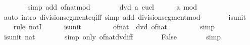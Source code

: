 \begin{isabellebody}
\ \ \ \ \ \ \isamarkupfalse%
\ {\isacharparenleft}{\kern0pt}simp\ add{\isacharcolon}{\kern0pt}\ of{\isacharunderscore}{\kern0pt}nat{\isacharunderscore}{\kern0pt}mod{\isacharparenright}{\kern0pt}\isanewline
\ \ \ \ \isamarkupfalse%
\ {\isacartoucheopen}{\isasymnot}\ {}\ dvd\ a{\isacartoucheclose}\ eucl\isanewline
\ \ \ \ \isamarkupfalse%
\ {\isachardoublequoteopen}a\ mod\ {}\ {\isacharequal}{\kern0pt}\ {}{\isachardoublequoteclose}\isanewline
\ \ \ \ \ \ \isamarkupfalse%
\ {\isacharparenleft}{\kern0pt}auto\ intro{\isacharcolon}{\kern0pt}\ division{\isacharunderscore}{\kern0pt}segment{\isacharunderscore}{\kern0pt}eq{\isacharunderscore}{\kern0pt}iff\ simp\ add{\isacharcolon}{\kern0pt}\ division{\isacharunderscore}{\kern0pt}segment{\isacharunderscore}{\kern0pt}mod{\isacharparenright}{\kern0pt}\isanewline
\ \ \isamarkupfalse%
\isanewline
\ \ \isamarkupfalse%
\ {\isachardoublequoteopen}{\isasymnot}\ is{\isacharunderscore}{\kern0pt}unit\ {}{\isachardoublequoteclose}\isanewline
\ \ \isamarkupfalse%
\ {\isacharparenleft}{\kern0pt}rule\ notI{\isacharparenright}{\kern0pt}\isanewline
\ \ \ \ \isamarkupfalse%
\ {\isachardoublequoteopen}is{\isacharunderscore}{\kern0pt}unit\ {}{\isachardoublequoteclose}\isanewline
\ \ \ \ \isamarkupfalse%
\ \isamarkupfalse%
\ {\isachardoublequoteopen}of{\isacharunderscore}{\kern0pt}nat\ {}\ dvd\ of{\isacharunderscore}{\kern0pt}nat\ {}{\isachardoublequoteclose}\isanewline
\ \ \ \ \ \ \isamarkupfalse%
\ simp\isanewline
\ \ \ \ \isamarkupfalse%
\ \isamarkupfalse%
\ {\isachardoublequoteopen}is{\isacharunderscore}{\kern0pt}unit\ {\isacharparenleft}{\kern0pt}{}{\isacharcolon}{\kern0pt}{\isacharcolon}{\kern0pt}nat{\isacharparenright}{\kern0pt}{\isachardoublequoteclose}\isanewline
\ \ \ \ \ \ \isamarkupfalse%
\ {\isacharparenleft}{\kern0pt}simp\ only{\isacharcolon}{\kern0pt}\ of{\isacharunderscore}{\kern0pt}nat{\isacharunderscore}{\kern0pt}dvd{\isacharunderscore}{\kern0pt}iff{\isacharparenright}{\kern0pt}\isanewline
\ \ \ \ \isamarkupfalse%
\ \isamarkupfalse%
\ False\isanewline
\ \ \ \ \ \ \isamarkupfalse%
\ simp\isanewline
\ \ \isamarkupfalse%
\isanewline
{}\isamarkupfalse%
%
\endisatagproof
{\isafoldproof}%
%
\isadelimproof
\isanewline
%
\endisadelimproof

\end{isabellebody}
